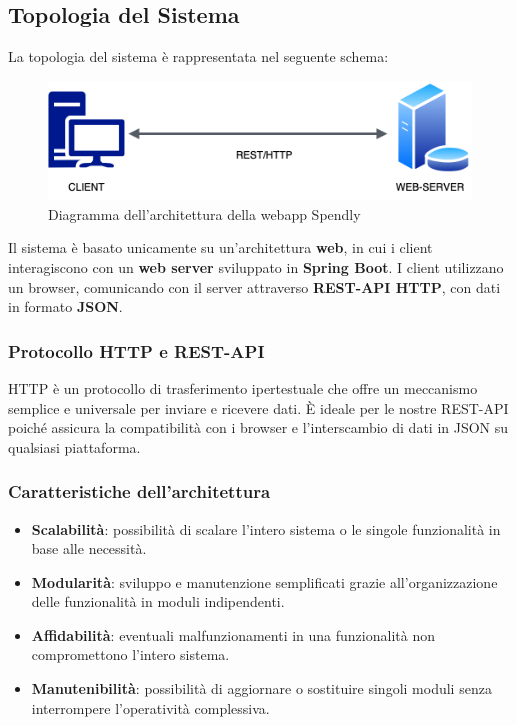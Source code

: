 \subsection{Topologia del Sistema}

La topologia del sistema è rappresentata nel seguente schema:

\begin{figure}[h]
\centering
\includegraphics[scale=0.75]{images/topologia.png}
\caption{Diagramma dell’architettura della webapp Spendly}
\end{figure}

Il sistema è basato unicamente su un’architettura \textbf{web}, in cui i client interagiscono con un \textbf{web server} sviluppato in \textbf{Spring Boot}. I client utilizzano un browser, comunicando con il server attraverso \textbf{REST-API HTTP}, con dati in formato \textbf{JSON}. 

\subsubsection{Protocollo HTTP e REST-API}

HTTP è un protocollo di trasferimento ipertestuale che offre un meccanismo semplice e universale per inviare e ricevere dati. È ideale per le nostre REST-API poiché assicura la compatibilità con i browser e l’interscambio di dati in JSON su qualsiasi piattaforma.

\subsubsection{Caratteristiche dell’architettura}

\begin{itemize}
\item \textbf{Scalabilità}: possibilità di scalare l’intero sistema o le singole funzionalità in base alle necessità.
\item \textbf{Modularità}: sviluppo e manutenzione semplificati grazie all’organizzazione delle funzionalità in moduli indipendenti.
\item \textbf{Affidabilità}: eventuali malfunzionamenti in una funzionalità non compromettono l’intero sistema.
\item \textbf{Manutenibilità}: possibilità di aggiornare o sostituire singoli moduli senza interrompere l’operatività complessiva.
\end{itemize}